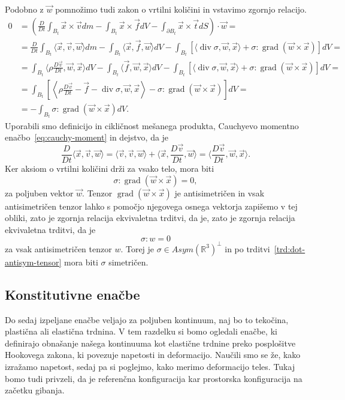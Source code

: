 \documentclass[12pt,a4paper]{article}
\theoremstyle{definition} %
\theoremstyle{plain} %
\numberwithin{equation}{section}
\newcommand{\R}{\mathbb R}
\renewcommand{\div}{\operatorname{div}}
\newcommand{\grad}{\operatorname{grad}}
\newcommand{\DD}[2]{\ensuremath{\frac{D #1}{D #2}}}
\newcommand{\DDt}[1]{\DD{#1}{t}}
\newcommand{\vv}{\vec{v}}
\newcommand{\vt}{\vec{t}}
\newcommand{\vw}{\vec{w}}
\newcommand{\vf}{\vec{f}}
\newcommand{\vx}{\vec{x}}
\newcommand{\ts}{\sigma}
\begin{document}
Podobno z $\vw$ pomnožimo tudi zakon o vrtilni količini in vstavimo zgornjo
relacijo.
\begin{align*}
  0 &= \left(\DDt{}\int_{B_t}\vx \times \vv dm - \int_{B_t} \vx \times \vf dV -
  \int_{\partial B_t} \vx\times\vt dS\right)\cdot \vw = \\ &=
  \DDt{}\int_{B_t}\langle \vx, \vv, \vw\rangle  dm - \int_{B_t} \langle \vx,
  \vf, \vw\rangle dV - \int_{B_t} [\langle \div \ts, \vw, \vx\rangle +  \ts :
  \grad (\vw \times \vx)] dV = \\ &=
  \int_{B_t}\langle \rho \DDt\vv, \vw, \vx \rangle  dV - \int_{B_t} \langle \vf,
  \vw, \vx\rangle dV - \int_{B_t} [\langle \div \ts, \vw, \vx\rangle +  \ts :
  \grad (\vw \times \vx)] dV = \\ &=
\int_{B_t}\left[ \left\langle\rho \DDt\vv - \vf - \div \ts, \vw, \vx\right\rangle -  \ts : \grad
  (\vw \times \vx)\right] dV = \\ &=
- \int_{B_t} \ts : \grad (\vw \times \vx) dV.
\end{align*}
Uporabili smo definicijo in cikličnost mešanega produkta, Cauchyevo momentno
enačbo~\eqref{eq:cauchy-moment} in dejstvo, da je
\[
  \DDt{}\langle \vx, \vv, \vw \rangle =
  \langle \vv, \vv, \vw \rangle +
  \langle \vx, \DDt\vv, \vw \rangle =
  \langle \DDt\vv, \vw, \vx \rangle.
\]
Ker aksiom o vrtilni količini drži za vsako telo, mora biti
\[
  \ts : \grad (\vw \times \vx) = 0,
\]
za poljuben vektor $\vw$. Tenzor $\grad (\vw \times \vx)$ je antisimetričen in
vsak antisimetričen tenzor lahko s pomočjo njegovega osnega vektorja zapišemo v
tej obliki, zato je zgornja relacija ekvivaletna trditvi, da je, zato je zgornja
relacija ekvivaletna trditvi, da je
\[ \ts : w = 0\] za vsak antisimetričen tenzor $w$.
Torej je $\ts \in Asym(\R^3)^\perp$ in po trditvi~\ref{trd:dot-antisym-tensor}
mora biti $\ts$ simetričen.
\endproof

\subsection{Konstitutivne enačbe}
Do sedaj izpeljane enačbe veljajo za poljuben kontinuum, naj bo to tekočina,
plastična ali elastična trdnina. V tem razdelku si bomo ogledali enačbe, ki
definirajo obnašanje našega kontinuuma kot elastične trdnine preko posplošitve
Hookovega zakona, ki povezuje napetosti in deformacijo. Naučili smo se že, kako
izražamo napetost, sedaj pa si poglejmo, kako merimo deformacijo teles.
Tukaj bomo tudi privzeli, da je referenčna konfiguracija kar prostorska
konfiguracija na začetku gibanja.
\end{document}
